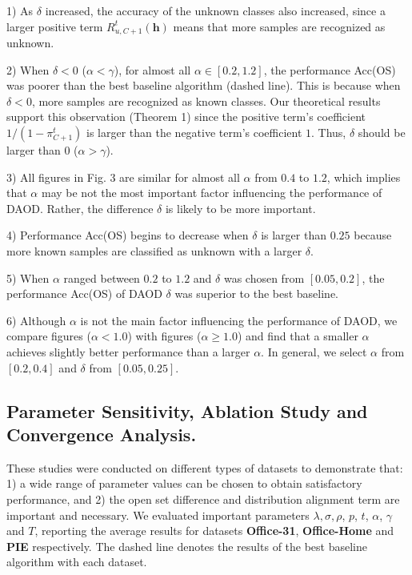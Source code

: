 \documentclass[journal]{IEEEtran}
\begin{document}
1) As $\delta$ increased, the accuracy of the unknown classes also increased, since a larger positive term $R^t_{u,C+1}({\bm h})$ means that more samples are recognized as unknown.


2) When $\delta<0$ ($\alpha<\gamma$), for almost all $\alpha\in [0.2,1.2]$, the performance Acc(OS) was poorer than the best baseline algorithm (dashed line). This is because when $\delta<0$, more samples are recognized as known classes.  Our theoretical results support this observation (Theorem 1) since the positive term’s coefficient $1/(1-\pi_{C+1}^t)$ is larger than the negative term's coefficient $1$. Thus, $\delta$ should be larger than $0$ ($\alpha>\gamma$).

3) All figures in Fig. 3 are similar for almost all $\alpha$ from $0.4$ to $1.2$,  which implies that  $\alpha$ may be not the most important factor influencing the performance of DAOD. Rather, the difference $\delta$ is likely to be more important.


4)	Performance Acc(OS) begins to decrease when $\delta$ is larger than $0.25$ because more known samples are classified as unknown with a larger $\delta$.

5) When $\alpha$ ranged between $0.2$ to $1.2$ and $\delta$ was chosen from $[0.05,0.2]$, the performance Acc(OS) of DAOD $\delta$ was superior to the best baseline.

6) Although $\alpha$ is not the main factor influencing the performance of DAOD, we compare figures ($\alpha<1.0$) with figures ($\alpha\geq1.0$) and find that a smaller $\alpha$ achieves slightly better performance than a larger $\alpha$. In general, we select $\alpha$ from  $[0.2,0.4]$ and $\delta$ from $[0.05,0.25]$.

 \subsection{{Parameter Sensitivity, Ablation Study and Convergence Analysis. }}
 
 These studies were conducted on different types of datasets to demonstrate that: 1) a wide range of parameter values can be chosen to obtain satisfactory performance, and 2) the open set difference and distribution alignment term are important and necessary.   We evaluated important parameters $\lambda, \sigma, \rho$, $p$, $t$, $\alpha$, $\gamma$ and $T$, reporting the average results for datasets \textbf{Office-31}, \textbf{Office-Home} and \textbf{PIE} respectively. The dashed line denotes the results of the best baseline algorithm with each dataset. 
 
\end{document}

